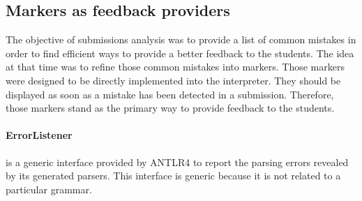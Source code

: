 \documentclass[11pt,a4paper,twoside,openright]{report}
\begin{document}
% 
% 
% 


\subsection{Markers as feedback providers} \label{ssec:markers}

The objective of submissions analysis was to provide a list of common mistakes 
in order to find efficient ways to provide a better feedback to the students. 
The idea at that time was to refine those common mistakes into markers. Those 
markers were designed to be directly implemented into the interpreter. They 
should be displayed as soon as a mistake has been detected in a submission. 
Therefore, those markers stand as the primary way to provide feedback to the 
students.

\paragraph{ErrorListener} 
is a generic interface provided by \textsc{ANTLR4} to report the parsing errors 
revealed by its generated parsers. This interface is generic because it is not 
related to a particular grammar.
\end{document}
